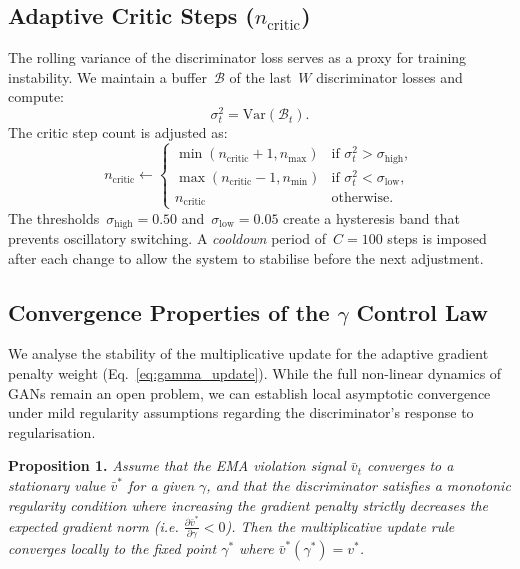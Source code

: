 \documentclass[journal]{IEEEtran}
\newcommand{\vtarget}{v^{*}}
\newcommand{\ncritic}{n_{\mathrm{critic}}}
\newcommand{\ncmax}{n_{\mathrm{max}}}
\newcommand{\ncmin}{n_{\mathrm{min}}}
\begin{document}
\subsection{Adaptive Critic Steps ($\ncritic$)}
\label{sec:ncritic}

The rolling variance of the discriminator loss serves as a proxy for training instability. We maintain a buffer~$\mathcal{B}$ of the last~$W$ discriminator losses and compute:
\begin{equation}
    \sigma^2_t = \mathrm{Var}(\mathcal{B}_t).
\label{eq:loss_var}
\end{equation}
The critic step count is adjusted as:
\begin{equation}
    \ncritic \leftarrow
    \begin{cases}
        \min(\ncritic + 1, \ncmax) & \text{if } \sigma^2_t > \sigma_{\mathrm{high}}, \\[3pt]
        \max(\ncritic - 1, \ncmin) & \text{if } \sigma^2_t < \sigma_{\mathrm{low}}, \\[3pt]
        \ncritic                    & \text{otherwise}.
    \end{cases}
\label{eq:ncritic_update}
\end{equation}
The thresholds~$\sigma_{\mathrm{high}} = 0.50$ and~$\sigma_{\mathrm{low}} = 0.05$ create a hysteresis band that prevents oscillatory switching. A \emph{cooldown} period of~$C=100$ steps is imposed after each change to allow the system to stabilise before the next adjustment.

\subsection{Convergence Properties of the $\gamma$ Control Law}
\label{sec:convergence}

We analyse the stability of the multiplicative update for the adaptive gradient penalty weight (Eq.~\ref{eq:gamma_update}). While the full non-linear dynamics of GANs remain an open problem, we can establish local asymptotic convergence under mild regularity assumptions regarding the discriminator's response to regularisation.

\textbf{Proposition 1.} \emph{Assume that the EMA violation signal $\bar{v}_t$ converges to a stationary value $\bar{v}^*$ for a given $\gamma$, and that the discriminator satisfies a monotonic regularity condition where increasing the gradient penalty strictly decreases the expected gradient norm (i.e. $\frac{\partial \bar{v}^*}{\partial \gamma} < 0$). Then the multiplicative update rule converges locally to the fixed point $\gamma^*$ where $\bar{v}^*(\gamma^*) = \vtarget$.}
\end{document}
